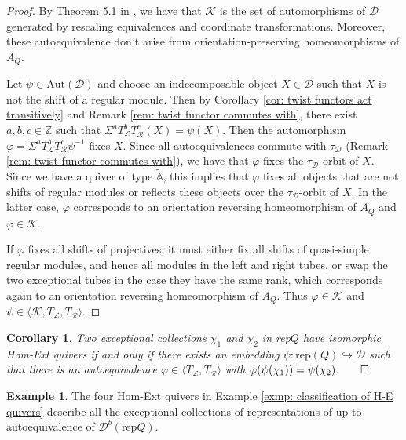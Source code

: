 \documentclass[12pt]{amsart}
\theoremstyle{plain}
\newtheorem{cor}[thm]{Corollary}
\theoremstyle{definition}
\newtheorem{exmp}{Example}
    [section]
\theoremstyle{remark}
\begin{document}
\begin{proof}
{\color{black}
By Theorem 5.1 in \cite{opper2019auto}, we have that $\mathscr{K}$ is the set of automorphisms of $\mathscr{D}$ generated by rescaling equivalences and coordinate transformations. Moreover, these autoequivalence don't arise from orientation-preserving homeomorphisms of $A_Q$. }

Let $\psi \in \text{Aut}(\mathscr{D})$ and choose an indecomposable object $X \in \mathscr{D}$ such that $X$ is not the shift of a regular module. Then by Corollary \ref{cor: twist functors act transitively} and Remark \ref{rem: twist functor commutes with}, there exist $a,b,c \in \mathbb{Z}$ such that $\Sigma^a T_{\mathscr{L}}^b T_{\mathscr{R}}^c (X) = \psi(X)$. Then the automorphism $\varphi = \Sigma^a T_{\mathscr{L}}^b T_{\mathscr{R}}^c \psi^{-1}$ fixes $X$. Since all autoequivalences commute with $\tau_{\mathscr{D}}$ (Remark \ref{rem: twist functor commutes with}), we have that $\varphi$ fixes the $\tau_{\mathscr{D}}$-orbit of $X$. Since we have a quiver of type $\tilde{\mathbb{A}}$, this implies that $\varphi$ fixes all objects that are not shifts of regular modules {\color{black} or reflects these objects over the $\tau_{\mathscr{D}}$-orbit of $X$. In the latter case, $\varphi$ corresponds to an orientation reversing homeomorphism of $A_Q$ and $\varphi \in \mathscr{K}$}.

{\color{black}
If $\varphi$ fixes all shifts of projectives, it must either fix all shifts of quasi-simple regular modules, and hence all modules in the left and right tubes, or swap the two exceptional tubes in the case they have the same rank, which corresponds again to an orientation reversing homeomorphism of $A_Q$. Thus $\varphi \in \mathscr{K}$ and $\psi \in \langle \mathscr{K}, T_{\mathscr{L}},T_{\mathscr{R}}\rangle$.}
\end{proof}

\begin{cor} \label{cor: iso HE quivers iff derived equiv}
Two exceptional collections $\chi_1$ and $\chi_2$ in rep$Q$ have {\color{black} isomorphic} Hom-Ext quivers if and only if there exists an embedding $\psi: \text{rep}(Q) \hookrightarrow \mathscr{D}$ such that there is an autoequivalence {\color{black} $\varphi\in \langle T_{\mathscr{L}},T_{\mathscr{R}}\rangle$} with $\varphi(\psi(\chi_1)) = \psi(\chi_2). \hfill \qed$ 
\end{cor}

\begin{exmp}{\color{black}
    The four Hom-Ext quivers in Example \ref{exmp: classification of H-E quivers} describe all the exceptional collections of representations of  up to autoequivalence of $\mathscr{D}^b(\text{rep}Q)$}. 
\end{exmp}
\end{document}

